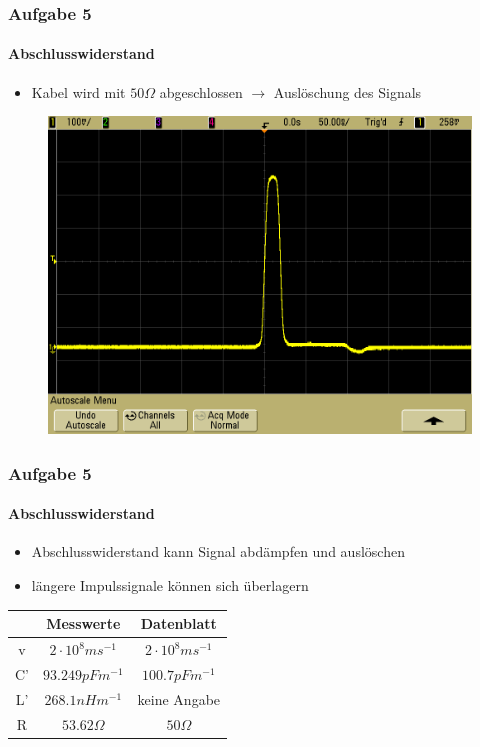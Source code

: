 \begin{frame}
    \frametitle{Aufgabe 5}
    \framesubtitle{Abschlusswiderstand}
    \begin{itemize}
        \item Kabel wird mit $50 \Omega$ abgeschlossen $\rightarrow$
        Auslöschung des Signals
    \end{itemize}
    \begin{figure}[H]
    \begin{center}
            \includegraphics[scale=0.2]{./img/5b_Abschluss.png}
    \end{center}
    \end{figure}
\end{frame}
\begin{frame}
    \frametitle{Aufgabe 5}
    \framesubtitle{Abschlusswiderstand}
    \begin{itemize}
        \item Abschlusswiderstand kann Signal abdämpfen und auslöschen
        \item längere Impulssignale können sich überlagern 
    \end{itemize}
    \begin{center}
    \begin{tabular}{c|c c}
    & Messwerte & Datenblatt \\
    \hline
    v & $2 \cdot 10^{8} ms^{-1}$ & $2 \cdot 10^{8} ms^{-1}$ \\
    C'& $93.249 pFm^{-1}$&$100.7 pFm^{-1}$ \\
    L'& $268.1 nHm^{-1}$& keine Angabe \\
    R & $53.62 \Omega$& $50 \Omega$
    \end{tabular}
    \end{center}
\end{frame}
